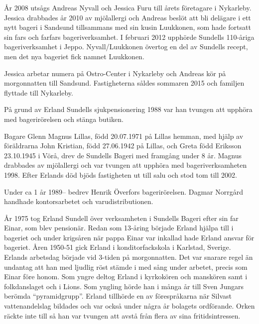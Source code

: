 År 2008 utsågs Andreas Nyvall och Jessica Furu till årets företagare i Nykarleby. Jessica drabbades år 2010 av mjölallergi och Andreas beslöt att bli delägare i ett nytt bageri i Sandsund tillsammans med sin kusin Luukkonen, som hade fortsatt sin fars och farfars bageriverksamhet. I februari 2012 upphörde Sundells 110-åriga bageriverksamhet i Jeppo. Nyvall/Luukkonen övertog en del av Sundells recept, men det nya bageriet fick namnet Luukkonen.
\begin{jhchildren}
  \item {}
  \item {}
  \item {}
\end{jhchildren}
Jessica arbetar numera på Ostro-Center i Nykarleby och Andreas kör på morgonnatten till Sandsund. Fastigheterna såldes sommaren 2015 och familjen flyttade till Nykarleby.


%
\jhvspace{}

%
På grund av Erland Sundells sjukpensionering 1988 var han tvungen att upphöra med bagerirörelsen och stänga butiken.



Bagare Glenn Magnus Lillas, född 20.07.1971 på Lillas hemman, med hjälp av föräldrarna John Kristian, född 27.06.1942 på Lillas,	och Greta född Eriksson 23.10.1945 i Vörå, drev de Sundells Bageri med framgång under 8 år. Magnus drabbades av mjölallergi och var tvungen att upphöra med bageriverksamheten 1998. Efter Erlands död bjöds fastigheten ut till salu och stod tom till 2002.


Under ca 1 år 1989-- bedrev Henrik Överfors bagerirörelsen. Dagmar Norrgård handhade kontorsarbetet och varudistributionen.


År 1975 tog Erland Sundell över verksamheten i Sundells Bageri efter sin far Einar, som blev pensionär. Redan som 13-åring började Erland hjälpa till i bageriet och under krigsåren när pappa Einar var inkallad hade Erland ansvar för bageriet. Åren 1950-51 gick Erland i konditorfackskola i Karlstad, Sverige. Erlands arbetsdag började vid 3-tiden på morgonnatten. Det var snarare regel än undantag att han med ljudlig röst stämde i med sång under arbetet, precis som Einar före honom. Som yngre deltog Erland i kyrkokören och manskören samt i folkdanslaget och i Lions. Som yngling hörde han i många år till Sven Jungars berömda ``pyramidgrupp''.  Erland tillhörde en av förespråkarna när Silvast vattenandelslag bildades och var också under några år bolagets ordförande. Orken räckte inte till så han var tvungen att avstå från flera av sina fritidsintressen.

